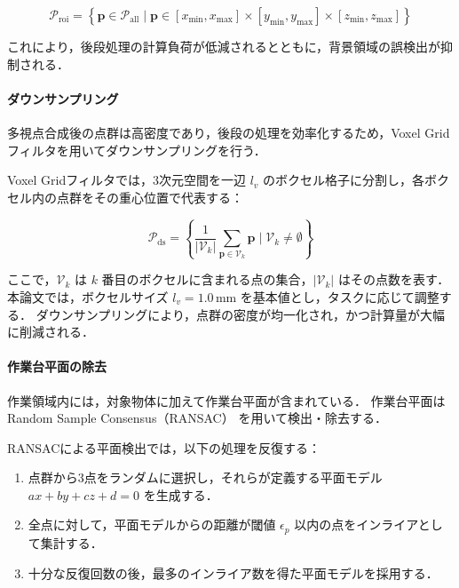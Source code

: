 \begin{equation}
  \mathcal{P}_{\mathrm{roi}} = \left\{ \bm{p} \in \mathcal{P}_{\mathrm{all}} \;|\; \bm{p} \in [x_{\min}, x_{\max}] \times [y_{\min}, y_{\max}] \times [z_{\min}, z_{\max}] \right\}
  \label{eq:system:roi}
\end{equation}

これにより，後段処理の計算負荷が低減されるとともに，背景領域の誤検出が抑制される．

\paragraph{ダウンサンプリング}

多視点合成後の点群は高密度であり，後段の処理を効率化するため，Voxel Gridフィルタを用いてダウンサンプリングを行う．

Voxel Gridフィルタでは，3次元空間を一辺 $l_v$ のボクセル格子に分割し，各ボクセル内の点群をその重心位置で代表する：

\begin{equation}
  \mathcal{P}_{\mathrm{ds}} = \left\{ \frac{1}{|\mathcal{V}_k|} \sum_{\bm{p} \in \mathcal{V}_k} \bm{p} \;|\; \mathcal{V}_k \neq \emptyset \right\}
\end{equation}

ここで，$\mathcal{V}_k$ は $k$ 番目のボクセルに含まれる点の集合，$|\mathcal{V}_k|$ はその点数を表す．
本論文では，ボクセルサイズ $l_v = 1.0$\,mm を基本値とし，タスクに応じて調整する．
ダウンサンプリングにより，点群の密度が均一化され，かつ計算量が大幅に削減される．

\paragraph{作業台平面の除去}

作業領域内には，対象物体に加えて作業台平面が含まれている．
作業台平面は Random Sample Consensus（RANSAC）\cite{PCL-RANSAC} を用いて検出・除去する．

RANSACによる平面検出では，以下の処理を反復する：
\begin{enumerate}
  \item 点群から3点をランダムに選択し，それらが定義する平面モデル $ax + by + cz + d = 0$ を生成する．
  \item 全点に対して，平面モデルからの距離が閾値 $\epsilon_p$ 以内の点をインライアとして集計する．
  \item 十分な反復回数の後，最多のインライア数を得た平面モデルを採用する．
\end{enumerate}

